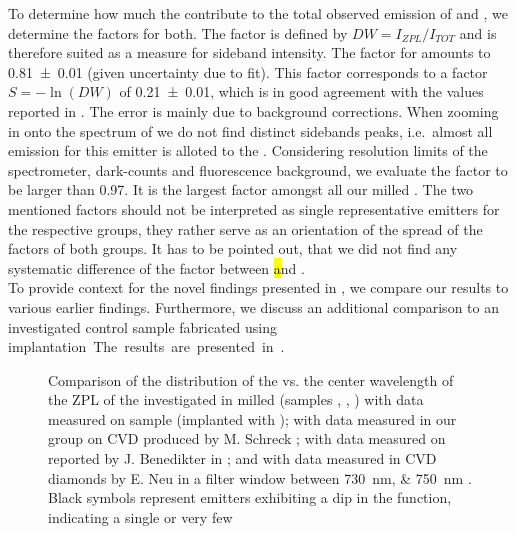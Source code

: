 	To determine how much the \ZPLs contribute to the total observed emission of \emnarrow and \embroad, we determine the \db factors for both.
	The \db factor is defined by $DW = I_{ZPL}/I_{TOT}$ and is therefore suited as a measure for sideband intensity.
	The \db factor for \emnarrow amounts to \num[separate-uncertainty]{0.81(1)} (given uncertainty due to fit).
	This \db factor corresponds to a \hr factor $S =- \ln{(DW)}$ \cite{Walker1979} of \num[separate-uncertainty]{0.21(1)}, which is in good agreement with the values reported in \cite{Neu2011b}.
	The error is mainly due to background corrections.
	When zooming in onto the spectrum of \embroad we do not find distinct sidebands peaks, i.e.\ almost all emission for this emitter is alloted to the \ZPL.
	Considering resolution limits of the spectrometer, dark-counts and fluorescence background, we evaluate the \db factor to be larger than \num[separate-uncertainty]{0.97}.
	It is the largest \db factor amongst all our milled \sivs.
	The two mentioned \db factors should not be interpreted as single representative emitters for the respective groups, they rather serve as an orientation of the spread of the \db factors of both groups.
	It has to be pointed out, that we did not find any systematic difference of the \db factor between \hl and \vl.
	\\
	To provide context for the novel findings presented in , we compare our results to various earlier findings.
	Furthermore, we discuss an additional comparison to an investigated control sample fabricated using \si implantation.
	The results are presented in .


	\begin{figure}[htp]
		\centering
		\caption[Comparison of obtained \siv \lws with available data sources]{Comparison of the distribution of the \lw vs. the center wavelength of the ZPL of the investigated \sivs in milled \nds (samples \insituF, \insituS, \insituH) with data measured on sample \implantedTao (implanted with \Si); with data measured in our group on CVD \nds produced by M. Schreck \cite{Neu2011b}; with data measured on \nds reported by J. Benedikter in \cite{Benedikter2017a}; and with data measured in CVD diamonds by E. Neu in a filter window between \SIlist{730; 750}{nm} \cite{Neu2012}. Black symbols represent emitters exhibiting a dip in the \gtz function, indicating a single or very few \sivs}
		\label{fig::bimodal_distr_compare}
	\end{figure}


